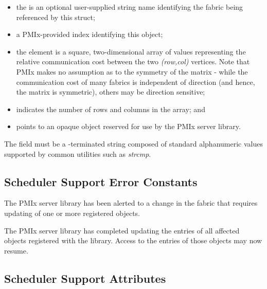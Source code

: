\begin{itemize}
    \item the  is an optional user-supplied string name identifying the fabric being referenced by this struct;
    \item a \ac{PMIx}-provided index identifying this object;
    \item the  element is a square, two-dimensional array of  values representing the relative communication cost between the two \textit{(row,col)} vertices. Note that \ac{PMIx} makes no assumption as to the symmetry of the matrix - while the communication cost of many fabrics is independent of direction (and hence, the  matrix is symmetric), others may be direction sensitive;
    \item {} indicates the number of rows and columns in the  array; and
    \item {} points to an opaque object reserved for use by the \ac{PMIx} server library.
\end{itemize}

The  field must be a -terminated string composed of standard alphanumeric values supported by common utilities such as \textit{strcmp}.


\subsection{Scheduler Support Error Constants}
\label{api:sched:errors}

\begin{constantdesc}

%
The \ac{PMIx} server library has been alerted to a change in the fabric that requires updating of one or more registered  objects.

%
The \ac{PMIx} server library has completed updating the entries of all affected  objects registered with the library. Access to the entries of those objects may now resume.

\end{constantdesc}


\subsection{Scheduler Support Attributes}
\label{api:sched:attrs}

